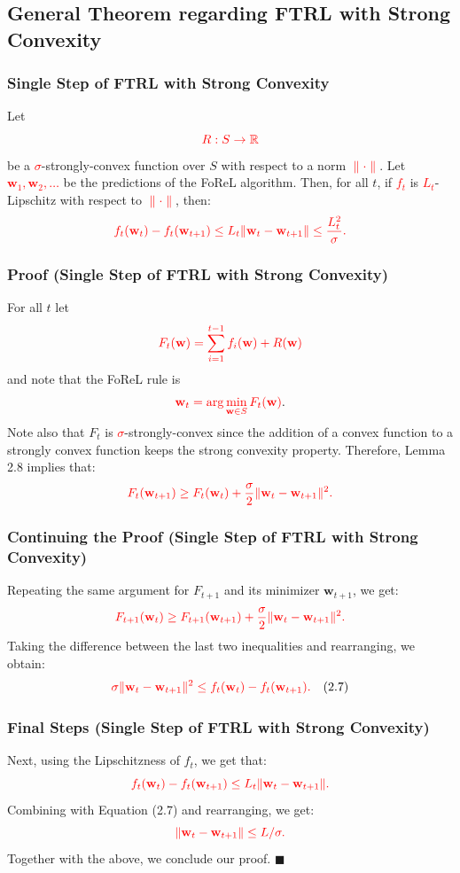 \documentclass[handout]{beamer}
\begin{document}
\subsection{General Theorem regarding FTRL with Strong Convexity}
\begin{frame}
    \frametitle{Single Step of FTRL with Strong Convexity}
    Let 
    \[
    \textcolor{red}{R : S \to \mathbb{R}}
    \]
    be a \textcolor{red}{$\sigma$}-strongly-convex function over $S$ with respect to a norm \textcolor{red}{$\|\cdot\|$}. Let \textcolor{red}{$\mathbf{w}_1, \mathbf{w}_2, \dots$} be the predictions of the FoReL algorithm. Then, for all $t$, if \textcolor{red}{$f_t$} is \textcolor{red}{$L_t$}-Lipschitz with respect to \textcolor{red}{$\|\cdot\|$}, then:
    \[
    \textcolor{red}{f_t(\mathbf{w}_t) - f_t(\mathbf{w}_{t+1}) \leq L_t \|\mathbf{w}_t - \mathbf{w}_{t+1}\| \leq \frac{L_t^2}{\sigma}.}
    \]
\end{frame}

\begin{frame}
    \frametitle{Proof (Single Step of FTRL with Strong Convexity)}
    For all $t$ let 
    \[
    \textcolor{red}{F_t(\mathbf{w}) = \sum_{i=1}^{t-1} f_i(\mathbf{w}) + R(\mathbf{w})}
    \]
    and note that the FoReL rule is 
    \[
    \textcolor{red}{\mathbf{w}_t = \arg\min_{\mathbf{w} \in S} F_t(\mathbf{w})}.
    \]
    Note also that $F_t$ is \textcolor{red}{$\sigma$}-strongly-convex since the addition of a convex function to a strongly convex function keeps the strong convexity property. Therefore, Lemma 2.8 implies that:
    \[
    \textcolor{red}{F_t(\mathbf{w}_{t+1}) \geq F_t(\mathbf{w}_t) + \frac{\sigma}{2} \|\mathbf{w}_t - \mathbf{w}_{t+1}\|^2.}
    \]
\end{frame}

\begin{frame}
    \frametitle{Continuing the Proof (Single Step of FTRL with Strong Convexity)}
    Repeating the same argument for $F_{t+1}$ and its minimizer $\mathbf{w}_{t+1}$, we get:
    \[
    \textcolor{red}{F_{t+1}(\mathbf{w}_t) \geq F_{t+1}(\mathbf{w}_{t+1}) + \frac{\sigma}{2} \|\mathbf{w}_t - \mathbf{w}_{t+1}\|^2.}
    \]
    Taking the difference between the last two inequalities and rearranging, we obtain:
    \[
    \textcolor{red}{\sigma \|\mathbf{w}_t - \mathbf{w}_{t+1}\|^2 \leq f_t(\mathbf{w}_t) - f_t(\mathbf{w}_{t+1}).} \quad (2.7)
    \]
\end{frame}

\begin{frame}
    \frametitle{Final Steps (Single Step of FTRL with Strong Convexity)}
    Next, using the Lipschitzness of $f_t$, we get that:
    \[
    \textcolor{red}{f_t(\mathbf{w}_t) - f_t(\mathbf{w}_{t+1}) \leq L_t \|\mathbf{w}_t - \mathbf{w}_{t+1}\|.}
    \]
    Combining with Equation (2.7) and rearranging, we get:
    \[
    \textcolor{red}{\|\mathbf{w}_t - \mathbf{w}_{t+1}\| \leq L / \sigma.}
    \]
    Together with the above, we conclude our proof. \hfill \(\blacksquare\)
\end{frame}
\end{document}
